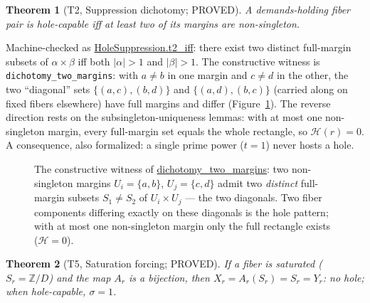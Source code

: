 \documentclass[11pt,a4paper]{article}
\newtheorem{theorem}{Theorem}
\theoremstyle{definition}
\begin{document}
\begin{theorem}[T2, Suppression dichotomy; PROVED]
  \label{thm:t2}
  A demands-holding fiber pair is hole-capable iff at least two of its
  margins are non-singleton.
\end{theorem}

Machine-checked as \url{HoleSuppression.t2_iff}: there exist two
distinct full-margin subsets of $\alpha\times\beta$ iff both
$\lvert\alpha\rvert>1$ and $\lvert\beta\rvert>1$. The constructive
witness is \texttt{dichotomy\_two\_margins}: with $a\ne b$ in one
margin and $c\ne d$ in the other, the two ``diagonal'' sets
$\{(a,c),(b,d)\}$ and $\{(a,d),(b,c)\}$ (carried along on fixed fibers
elsewhere) have full margins and differ
(Figure~\ref{fig:diagonals}). The reverse direction rests on the
subsingleton-uniqueness lemmas: with at most one non-singleton margin,
every full-margin set equals the whole rectangle, so
$\mathcal{H}(r)=0$. A consequence, also formalized: a single prime
power ($t=1$) never hosts a hole.

\begin{figure}[t]
  \centering
  \caption{The constructive witness of
    \url{dichotomy_two_margins}: two non-singleton margins
    $U_i=\{a,b\}$, $U_j=\{c,d\}$ admit two \emph{distinct} full-margin
    subsets $S_1\ne S_2$ of $U_i\times U_j$ --- the two diagonals. Two
    fiber components differing exactly on these diagonals is the
    hole pattern; with at most one non-singleton margin only the full
    rectangle exists ($\mathcal{H}=0$).}
  \label{fig:diagonals}
\end{figure}

\begin{theorem}[T5, Saturation forcing; PROVED]
  \label{thm:t5}
  If a fiber is saturated ($S_r=\mathbb{Z}/D$) and the map
  $A_r$ is a bijection, then $X_r=A_r(S_r)=S_r=Y_r$: no hole; when
  hole-capable, $\sigma=1$.
\end{theorem}
\end{document}
